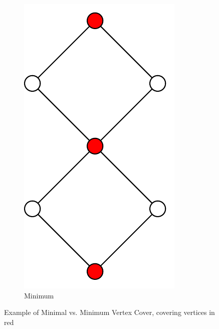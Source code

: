 \begin{figure}[ht]
  \hspace{2em}
  \begin{subfigure}{0.25\textwidth}
    \centering
    \includegraphics[width=\textwidth]{img/example_minimum_vertex_cover.pdf}
    \caption{Minimum}
  \end{subfigure}
  \caption{\label{fig:example_vertex_cover}%
    Example of Minimal vs. Minimum Vertex Cover, covering vertices %
    in red
  }
\end{figure}

